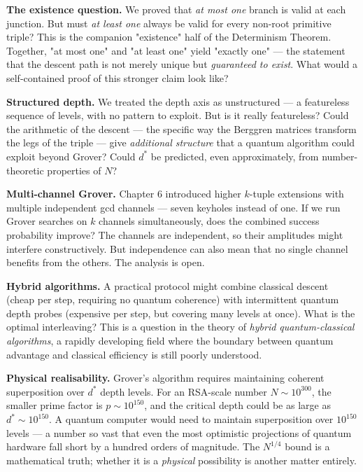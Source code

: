 \textbf{The existence question.} We proved that \textit{at most one} branch is valid at each junction. But must \textit{at least one} always be valid for every non-root primitive triple? This is the companion "existence" half of the Determinism Theorem. Together, "at most one" and "at least one" yield "exactly one" --- the statement that the descent path is not merely unique but \textit{guaranteed to exist}. What would a self-contained proof of this stronger claim look like?

\textbf{Structured depth.} We treated the depth axis as unstructured --- a featureless sequence of levels, with no pattern to exploit. But is it really featureless? Could the arithmetic of the descent --- the specific way the Berggren matrices transform the legs of the triple --- give \textit{additional structure} that a quantum algorithm could exploit beyond Grover? Could $d^*$ be predicted, even approximately, from number-theoretic properties of $N$?

\textbf{Multi-channel Grover.} Chapter 6 introduced higher $k$-tuple extensions with multiple independent gcd channels --- seven keyholes instead of one. If we run Grover searches on $k$ channels simultaneously, does the combined success probability improve? The channels are independent, so their amplitudes might interfere constructively. But independence can also mean that no single channel benefits from the others. The analysis is open.

\textbf{Hybrid algorithms.} A practical protocol might combine classical descent (cheap per step, requiring no quantum coherence) with intermittent quantum depth probes (expensive per step, but covering many levels at once). What is the optimal interleaving? This is a question in the theory of \textit{hybrid quantum-classical algorithms}, a rapidly developing field where the boundary between quantum advantage and classical efficiency is still poorly understood.

\textbf{Physical realisability.} Grover's algorithm requires maintaining coherent superposition over $d^*$ depth levels. For an RSA-scale number $N \sim 10^{300}$, the smaller prime factor is $p \sim 10^{150}$, and the critical depth could be as large as $d^* \sim 10^{150}$. A quantum computer would need to maintain superposition over $10^{150}$ levels --- a number so vast that even the most optimistic projections of quantum hardware fall short by a hundred orders of magnitude. The $N^{1/4}$ bound is a mathematical truth; whether it is a \textit{physical} possibility is another matter entirely.

